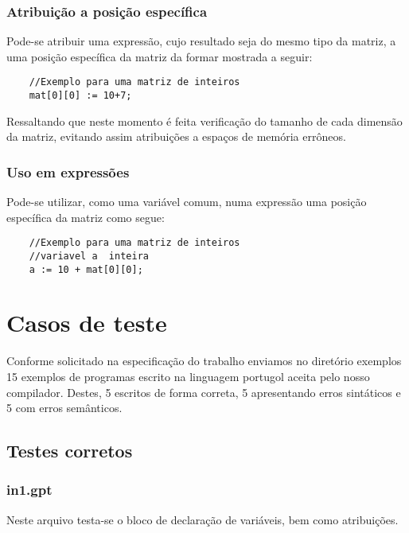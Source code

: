 \documentclass[a4paper,12pt]{report}
\begin{document}
\subsubsection{Atribui\c{c}\~ao a posi\c{c}\~ao espec\'ifica}

Pode-se atribuir uma express\~ao, cujo resultado seja do mesmo tipo da matriz, a uma posi\c{c}\~ao espec\'ifica da matriz da formar mostrada a seguir:

\begin{verbatim}
	//Exemplo para uma matriz de inteiros
	mat[0][0] := 10+7;
\end{verbatim}

Ressaltando que neste momento \'e feita verifica\c{c}\~ao do tamanho de cada dimens\~ao da
matriz, evitando assim atribui\c{c}\~oes a espa\c{c}os de mem\'oria err\^oneos.

\subsubsection{Uso em express\~oes}

Pode-se utilizar, como uma vari\'avel comum, numa express\~ao uma posi\c{c}\~ao espec\'ifica 
da matriz como segue:

\begin{verbatim}
	//Exemplo para uma matriz de inteiros
    //variavel a  inteira
	a := 10 + mat[0][0];
\end{verbatim}

\section{Casos de teste}

Conforme solicitado na especifica\c{c}\~ao do trabalho enviamos no diret\'orio exemplos 15
exemplos de programas escrito na linguagem portugol aceita pelo nosso compilador. 
Destes, 5 escritos de forma correta, 5 apresentando erros sint\'aticos e 5 com erros 
sem\^anticos.


\subsection{Testes corretos}

\subsubsection{in1.gpt}

Neste arquivo testa-se o bloco de declara\c{c}\~ao de vari\'aveis, bem como atribui\c{c}\~oes.
\end{document}
